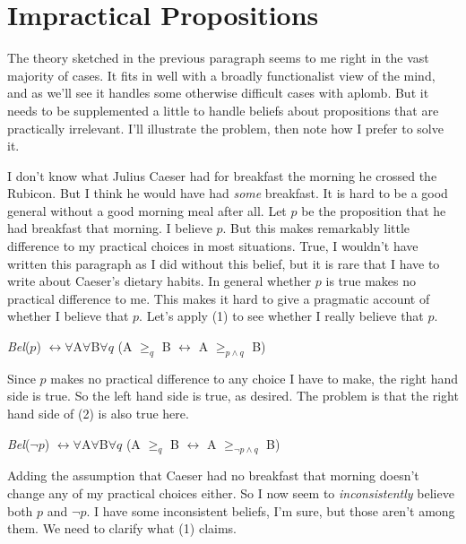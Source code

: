 \section{Impractical Propositions}

The theory sketched in the previous paragraph seems to me right in the vast majority of cases. It fits in well with a broadly functionalist view of the mind, and as we'll see it handles some otherwise difficult cases with aplomb. But it needs to be supplemented a little to handle beliefs about propositions that are practically irrelevant. I'll illustrate the problem, then note how I prefer to solve it.

I don't know what Julius Caeser had for breakfast the morning he crossed the Rubicon. But I think he would have had \textit{some} breakfast. It is hard to be a good general without a good morning meal after all. Let \(p\) be the proposition that he had breakfast that morning. I believe \(p\). But this makes remarkably little difference to my practical choices in most situations. True, I wouldn't have written this paragraph as I did without this belief, but it is rare that I have to write about Caeser's dietary habits. In general whether \(p\) is true makes no practical difference to me. This makes it hard to give a pragmatic account of whether I believe that \(p\). Let's apply (1) to see whether I really believe that \(p\).

\begin{enumerate*}
\item \textit{Bel}(\(p\)) \(\leftrightarrow \forall\)A\(\forall\)B\(\forall q\) (A \(\geq _q\) B \(\leftrightarrow\) A \(\geq _{p \wedge q}\) B)
\end{enumerate*}

\noindent Since \(p\) makes no practical difference to any choice I have to make, the right hand side is true. So the left hand side is true, as desired. The problem is that the right hand side of (2) is also true here.

\begin{enumerate*}
\setcounter{enumi}{1}
\item \textit{Bel}(\(\neg p\)) \(\leftrightarrow \forall\)A\(\forall\)B\(\forall q\) (A \(\geq _q\) B \(\leftrightarrow\) A \(\geq _{\neg p \wedge q}\) B)
\end{enumerate*}

\noindent Adding the assumption that Caeser had no breakfast that morning doesn't change any of my practical choices either. So I now seem to \textit{inconsistently} believe both \(p\) and \(\neg p\). I have some inconsistent beliefs, I'm sure, but those aren't among them. We need to clarify what (1) claims.

